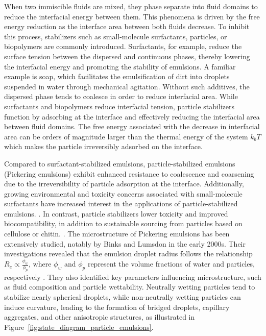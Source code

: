 When two immiscible fluids are mixed, they phase separate into fluid domains to reduce the interfacial energy between them. This phenomena is driven by the free energy
reduction as the interface area between both fluids decrease. To inhibit this process, stabilizers such as small-molecule surfactants, particles, or biopolymers are commonly introduced. 
Surfactants, for example, reduce the surface tension between the dispersed and continuous phases, thereby lowering the interfacial energy and promoting the stability of emulsions. 
A familiar example is soap, which facilitates the emulsification of dirt into droplets suspended in water through mechanical agitation.
Without such additives, the dispersed phase tends to coalesce in order to reduce interfacial area. While surfactants and biopolymers reduce interfacial tension, particle stabilizers 
function by adsorbing at the interface and effectively reducing the interfacial area between fluid domains. The free energy associated with the decrease in interfacial area 
can be orders of magnitude larger than the thermal energy of the system $k_b T$ which makes the particle irreversibly adsorbed on the interface. \cite{ngai_particle-stabilized_2015}

Compared to surfactant-stabilized emulsions, particle-stabilized emulsions (Pickering emulsions) exhibit enhanced resistance to coalescence and coarsening
due to the irreversibility of particle adsorption at the interface. \cite{ngai_particle-stabilized_2015} 
Additionally, growing environmental and toxicity concerns associated with small-molecule surfactants have increased interest in the applications of particle-stabilized emulsions.
\cite{kaczerewska_environmental_2020, lechuga_acute_2016}. In contrast, particle stabilizers lower toxicity and improved biocompatibility, in addition to 
sustainable sourcing from particles based on cellulose or chitin. \cite{fujisawa_nanocellulose-stabilized_2017, tang_stimuli-responsive_2016, kalliola_carboxymethyl_2018}.
The microstructure of Pickering emulsions has been extensively studied, notably by Binks and Lumsdon in the early 2000s. Their investigations revealed that the emulsion droplet radius 
follows the relationship $R_e \propto \frac{\phi_w}{\phi_p}$, where $\phi_w$ and $\phi_p$ represent the volume fractions of water and particles, respectively \cite{binks_pickering_2001}. 
They also identified key parameters influencing microstructure, such as fluid composition and particle wettability. Neutrally wetting particles tend to stabilize nearly spherical droplets, 
while non-neutrally wetting particles can induce curvature, leading to the formation of bridged droplets, capillary aggregates, and other anisotropic structures, as illustrated in 
Figure~\ref{fig:state_diagram_particle_emulsions}.

